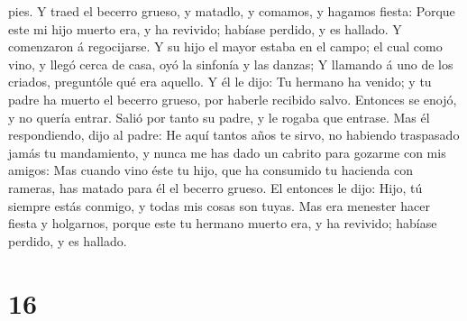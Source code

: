 pies.  Y traed el becerro grueso, y matadlo, y comamos, y
hagamos fiesta:  Porque este mi hijo muerto era, y ha
revivido; habíase perdido, y es hallado. Y comenzaron á regocijarse.
 Y su hijo el mayor estaba en el campo; el cual como vino,
y llegó cerca de casa, oyó la sinfonía y las danzas;  Y
llamando á uno de los criados, preguntóle qué era aquello. 
Y él le dijo: Tu hermano ha venido; y tu padre ha muerto el becerro
grueso, por haberle recibido salvo.  Entonces se enojó, y
no quería entrar. Salió por tanto su padre, y le rogaba que entrase.
 Mas él respondiendo, dijo al padre: He aquí tantos años te
sirvo, no habiendo traspasado jamás tu mandamiento, y nunca me has dado
un cabrito para gozarme con mis amigos:  Mas cuando vino
éste tu hijo, que ha consumido tu hacienda con rameras, has matado para
él el becerro grueso.  El entonces le dijo: Hijo, tú
siempre estás conmigo, y todas mis cosas son tuyas.  Mas
era menester hacer fiesta y holgarnos, porque este tu hermano muerto
era, y ha revivido; habíase perdido, y es hallado.

\hypertarget{section-15}{%
\section{16}\label{section-15}}

